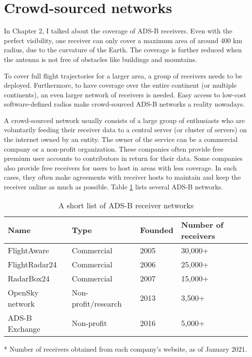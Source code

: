 \vspace{2em}


\section{Crowd-sourced networks}

In Chapter 2, I talked about the coverage of ADS-B receivers. Even with the perfect visibility, one receiver can only cover a maximum area of around 400 km radius, due to the curvature of the Earth. The coverage is further reduced when the antenna is not free of obstacles like buildings and mountains. 

To cover full flight trajectories for a larger area, a group of receivers needs to be deployed. Furthermore, to have coverage over the entire continent (or multiple continents), an even larger network of receivers is needed. Easy access to low-cost software-defined radios make crowd-sourced ADS-B networks a reality nowadays.

A crowd-sourced network usually consists of a large group of enthusiasts who are voluntarily feeding their receiver data to a central server (or cluster of servers) on the internet owned by an entity. The owner of the service can be a commercial company or a non-profit organization. These companies often provide free premium user accounts to contributors in return for their data. Some companies also provide free receivers for users to host in areas with less coverage. In such cases, they often make agreements with receiver hosts to maintain and keep the receiver online as much as possible. Table \ref{tb:adsb_networks} lists several ADS-B networks.

\begin{table}[ht]
\caption{A short list of ADS-B receiver networks}
\label{tb:adsb_networks}
\begin{threeparttable}
\begin{tabular}{|l|l|l|l|}
\hline
\textbf{Name} & \textbf{Type} & \textbf{Founded} & \textbf{Number of receivers} \\ \hline
FlightAware & Commercial & 2005 & 30,000+\tnote{*} \\ \hline
FlightRadar24 & Commercial & 2006 & 25,000+\tnote{*} \\ \hline
RadarBox24 & Commercial & 2007 & 15,000+ \\ \hline
OpenSky network & Non-profit/research & 2013 & 3,500+\tnote{*} \\ \hline
ADS-B Exchange & Non-profit & 2016 & 5,000+\tnote{*} \\ \hline
\end{tabular}
\begin{tablenotes}
\item[*] Number of receivers obtained from each company's website, as of January 2021.
\end{tablenotes}
\end{threeparttable}    
\end{table}

